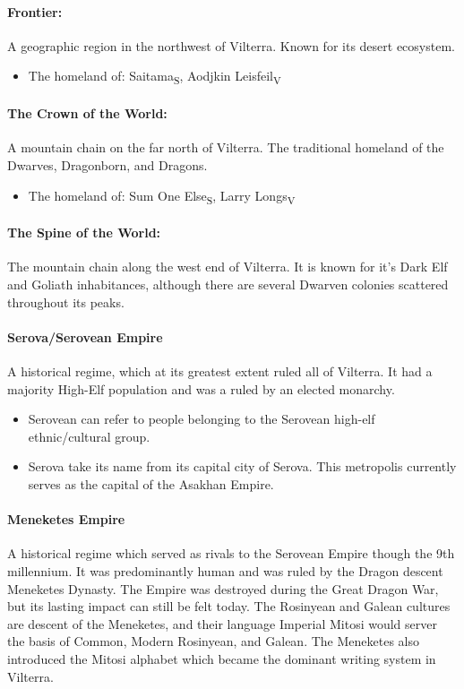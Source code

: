 \documentclass[../main.tex]{subfiles}
\begin{document}
\paragraph{Frontier:}
A geographic region in the northwest of Vilterra. Known for its desert ecosystem.
\begin{itemize}
    \item The homeland of: Saitama\textsubscript{S}, Aodjkin Leisfeil\textsubscript{V}
\end{itemize}
\paragraph{The Crown of the World:}
A mountain chain on the far north of Vilterra. The traditional homeland of the Dwarves, Dragonborn, and Dragons.
\begin{itemize}
    \item The homeland of: Sum One Else\textsubscript{S}, Larry Longs\textsubscript{V}
\end{itemize}
\paragraph{The Spine of the World:}
The mountain chain along the west end of Vilterra. It is known for it’s Dark Elf and Goliath inhabitances, although there are several Dwarven colonies scattered throughout its peaks.
\paragraph{Serova/Serovean Empire}
A historical regime, which at its greatest extent ruled all of Vilterra. It had a majority High-Elf population and was a ruled by an elected monarchy.
\begin{itemize}
    \item Serovean can refer to people belonging to the Serovean high-elf ethnic/cultural group.
    \item Serova take its name from its capital city of Serova. This metropolis currently serves as the capital of the Asakhan Empire.
\end{itemize}
\paragraph{Meneketes Empire }
A historical regime which served as rivals to the Serovean Empire though the 9th millennium. It was predominantly human and was ruled by the Dragon descent Meneketes Dynasty. The Empire was destroyed during the Great Dragon War, but its lasting impact can still be felt today. The Rosinyean and Galean cultures are descent of the Meneketes, and their language Imperial Mitosi would server the basis of Common,  Modern Rosinyean, and Galean. The Meneketes also introduced the Mitosi alphabet which became the dominant writing system in Vilterra.
\end{document}
